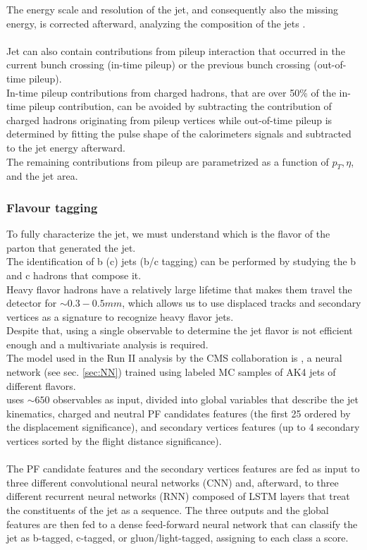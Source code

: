 The energy scale and resolution of the jet, and consequently also the missing energy, is corrected afterward, analyzing the composition of the jets  \cite{Khachatryan2017JetTeV}.\\
\\
Jet can also contain contributions from pileup interaction that occurred in the current bunch crossing (in-time pileup) or the previous bunch crossing (out-of-time pileup).\\
In-time pileup contributions from charged hadrons, that are over 50\% of the in-time pileup contribution, can be avoided by subtracting the contribution of charged hadrons originating from pileup vertices while out-of-time pileup is determined by fitting the pulse shape of the calorimeters signals and subtracted to the jet energy afterward.\\
The remaining contributions from pileup are parametrized as a function of $p_T, \eta$, and the jet area.

\subsubsection*{Flavour tagging}
To fully characterize the jet, we must understand which is the flavor of the parton that generated the jet.\\
The identification of b (c) jets (b/c tagging) can be performed by studying the b and c hadrons that compose it.\\
Heavy flavor hadrons have a relatively large lifetime that makes them travel the detector for $\sim 0.3-0.5mm$, which allows us to use displaced tracks and secondary vertices as a signature to recognize heavy flavor jets.\\
Despite that, using a single observable to determine the jet flavor is not efficient enough and a multivariate analysis is required.\\
The model used in the Run II analysis by the CMS collaboration is \DeepJet \cite{Bols2020JetDeepJet}, a neural network (see sec. \ref{sec:NN}) trained using labeled MC samples of AK4 jets of different flavors.\\
\DeepJet uses $\sim 650$ observables as input, divided into global variables that describe the jet kinematics, charged and neutral PF candidates features (the first 25 ordered by the displacement significance), and secondary vertices features (up to 4 secondary vertices sorted by the flight distance significance).\\
\\
The PF candidate features and the secondary vertices features are fed as input to three different convolutional neural networks (CNN) \cite{OShea2015AnNetworks} and, afterward, to three different recurrent neural networks (RNN) composed of LSTM layers \cite{Sherstinsky2018FundamentalsNetwork} that treat the constituents of the jet as a sequence. The three outputs and the global features are then fed to a dense feed-forward neural network that can classify the jet as b-tagged, c-tagged, or gluon/light-tagged, assigning to each class a score.

